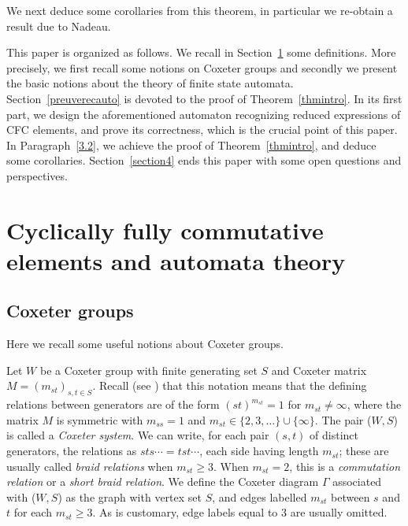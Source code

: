 \documentclass[reqno,12pt]{amsart}
\theoremstyle{definition}
\begin{document}
We next deduce some corollaries from this theorem, in particular we re-obtain a result due to Nadeau.

\medskip
 
This paper is organized as follows. We recall in Section~\ref{section2} some definitions. More precisely, we first recall some notions on Coxeter groups and secondly we present the basic notions about the theory of finite state automata. Section~\ref{preuverecauto} is devoted to the proof of Theorem~\ref{thmintro}.  In its first part, we design the aforementioned automaton recognizing reduced expressions of CFC elements, and prove its correctness, which is the crucial point of this paper. In Paragraph~\ref{3.2}, we achieve the proof of Theorem~\ref{thmintro}, and deduce some corollaries.  Section~\ref{section4} ends this paper with some open questions and perspectives.




\section{Cyclically fully commutative elements and automata theory}\label{section2}

\subsection{Coxeter groups} Here we recall some useful notions about Coxeter groups.

 Let $W$ be a Coxeter group with finite generating set $S$ and Coxeter matrix $M=(m_{st})_{s,t \in S}$. Recall (see \cite{BB}) that this notation means that the defining relations between generators are of the form $(st)^{m_{st}}=1$ for $m_{st} \neq \infty$, where the matrix $M$ is symmetric  with $m_{ss}= 1$ and  $m_{st} \in \{ 2, 3, \ldots\} \cup \{  \infty \}$. The pair ($W, S$) is called a \textit{Coxeter system}. We can write, for each pair $(s,t)$ of distinct generators, the relations as $sts\cdots =tst \cdots$, each side having length $m_{st}$; these are usually called \textit{braid relations} when $m_{st}\geq 3$. When $m_{st}=2$, this is a \textit{commutation relation} or a \textit{short braid relation}. We define the Coxeter diagram $\Gamma$ associated with ($W,S$) as the graph with vertex set $S$, and  edges labelled $m_{st}$ between $s$ and $t$ for each $m_{st} \geq 3$. As is customary, edge labels equal to $3$ are usually omitted.
 
\end{document}

